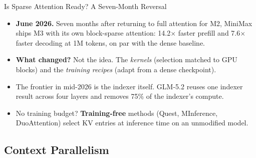 \begin{frame}{Is Sparse Attention Ready? A Seven-Month Reversal}
    \begin{itemize}\itemsep0.55em
        \item \textbf{June 2026.} Seven months after returning to full attention for M2, MiniMax ships M3 with its own block-sparse attention: 14.2$\times$ faster prefill and 7.6$\times$ faster decoding at 1M tokens, on par with the dense baseline.
        \item \textbf{What changed?} Not the idea. The \emph{kernels} (selection matched to GPU blocks) and the \emph{training recipes} (adapt from a dense checkpoint).
        \item The frontier in mid-2026 is the indexer itself. GLM-5.2 reuses one indexer result across four layers and removes 75\% of the indexer's compute.
        \item No training budget? \textbf{Training-free} methods (Quest, MInference, DuoAttention) select KV entries at inference time on an unmodified model.
    \end{itemize}
\end{frame}

\subsection{Context Parallelism}

